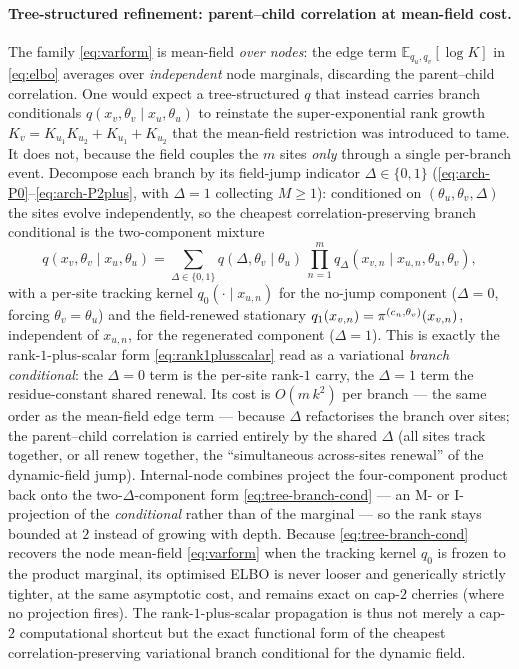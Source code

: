 \paragraph{Tree-structured refinement: parent--child correlation at
mean-field cost.} The family \eqref{eq:varform} is mean-field
\emph{over nodes}: the edge term $\mathbb{E}_{q_u,q_v}[\log K]$ in
\eqref{eq:elbo} averages over \emph{independent} node marginals,
discarding the parent--child correlation. One would expect a
tree-structured $q$ that instead carries branch conditionals
$q(x_v,\theta_v\!\mid\!x_u,\theta_u)$ to reinstate the
super-exponential rank growth $K_v = K_{u_1}K_{u_2}+K_{u_1}+K_{u_2}$
that the mean-field restriction was introduced to tame. It does not,
because the field couples the $m$ sites \emph{only} through a single
per-branch event. Decompose each branch by its field-jump indicator
$\Delta\in\{0,1\}$ (\eqref{eq:arch-P0}--\eqref{eq:arch-P2plus}, with
$\Delta=1$ collecting $M\ge1$): conditioned on
$(\theta_u,\theta_v,\Delta)$ the sites evolve independently, so the
cheapest correlation-preserving branch conditional is the two-component
mixture
\begin{equation}
  q(x_v,\theta_v\!\mid\!x_u,\theta_u)
     = \!\!\sum_{\Delta\in\{0,1\}}\!\! q(\Delta,\theta_v\!\mid\!\theta_u)\,
        \prod_{n=1}^{m} q_\Delta(x_{v,n}\!\mid\!x_{u,n},\theta_u,\theta_v),
  \label{eq:tree-branch-cond}
\end{equation}
with a per-site tracking kernel $q_0(\cdot\!\mid\!x_{u,n})$ for the
no-jump component ($\Delta=0$, forcing $\theta_v=\theta_u$) and the
field-renewed stationary
$q_1(x_{v,n})=\pi^{(c_n,\theta_v)}(x_{v,n})$, independent of
$x_{u,n}$, for the regenerated component ($\Delta=1$). This is
exactly the rank-$1$-plus-scalar form \eqref{eq:rank1plusscalar} read
as a variational \emph{branch conditional}: the $\Delta=0$ term is the
per-site rank-$1$ carry, the $\Delta=1$ term the residue-constant
shared renewal. Its cost is $O(m\,k^2)$ per branch --- the same order
as the mean-field edge term --- because $\Delta$ refactorises the
branch over sites; the parent--child correlation is carried entirely
by the shared $\Delta$ (all sites track together, or all renew
together, the ``simultaneous across-sites renewal'' of the
dynamic-field jump). Internal-node combines project the four-component
product back onto the two-$\Delta$-component form
\eqref{eq:tree-branch-cond} --- an M- or I-projection of the
\emph{conditional} rather than of the marginal --- so the rank stays
bounded at $2$ instead of growing with depth. Because
\eqref{eq:tree-branch-cond} recovers the node mean-field
\eqref{eq:varform} when the tracking kernel $q_0$ is frozen to the
product marginal, its optimised ELBO is never looser and generically
strictly tighter, at the same asymptotic cost, and remains exact on
cap-$2$ cherries (where no projection fires). The rank-$1$-plus-scalar
propagation is thus not merely a cap-$2$ computational shortcut but the
exact functional form of the cheapest correlation-preserving
variational branch conditional for the dynamic field.

